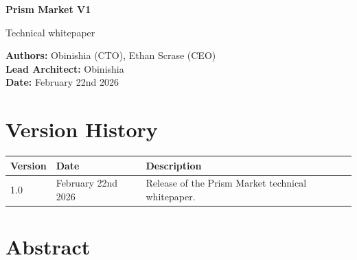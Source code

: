 \documentclass[11pt,a4paper]{article}
\begin{document}
\begin{titlepage}
    \centering
    \vspace*{4cm}
    {\Huge\bfseries Prism Market V1\par}
    \vspace{0.5cm}
    {\Large Technical whitepaper\par}
    \vspace{2cm}
    {\large
        \textbf{Authors:} Obinishia (CTO), Ethan Scrase (CEO)\\[0.3em]
        \textbf{Lead Architect:} Obinishia\\[0.3em]
        \textbf{Date:} February 22nd 2026
    \par}
    \vfill
\end{titlepage}

\newpage
\tableofcontents
\newpage

\section*{Version History}
\begin{tabular}{@{}lll@{}}
\toprule
\textbf{Version} & \textbf{Date}       & \textbf{Description}                                                                 \\ \midrule
1.0              & February 22nd 2026 & Release of the Prism Market technical whitepaper.\\ \bottomrule
\end{tabular}

\section*{Abstract}
\end{document}

